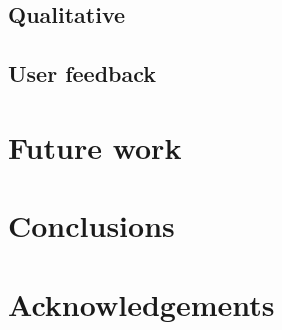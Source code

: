 \documentclass[a4paper,11pt,twocolumn]{article}
\begin{document}
\subsection{Qualitative}

\subsection{User feedback}

\section{Future work}

\section{Conclusions}

\section*{Acknowledgements}



\end{document}
